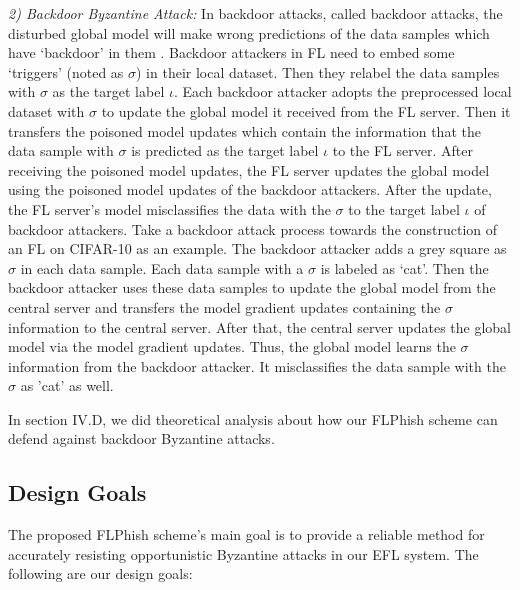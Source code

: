 \documentclass[lettersize,journal]{IEEEtran}
\begin{document}
\par \textit{2) Backdoor Byzantine Attack:} In backdoor attacks, called backdoor attacks, the disturbed global model will make wrong predictions of the data samples which have `backdoor' in them \cite{ref_08_data,ref_09_backdoor,ref_10_backdoor,ref_11_backdoor,ref_19_backdoor}. Backdoor attackers in FL need to embed some `triggers' (noted as $\sigma$) in their local dataset. Then they relabel the data samples with $\sigma$ as the target label $\iota$. Each backdoor attacker adopts the preprocessed local dataset with $\sigma$ to update the global model it received from the FL server. Then it transfers the poisoned model updates which contain the information that the data sample with $\sigma$ is predicted as the target label $\iota$ to the FL server. After receiving the poisoned model updates, the FL server updates the global model using the poisoned model updates of the backdoor attackers. After the update, the FL server's model misclassifies the data with the $\sigma$ to the target label $\iota$ of backdoor attackers. Take a backdoor attack process towards the construction of an FL on CIFAR-10 as an example. The backdoor attacker adds a grey square as $\sigma$ in each data sample. Each data sample with a $\sigma$ is labeled as `cat'. Then the backdoor attacker uses these data samples to update the global model from the central server and transfers the model gradient updates containing the $\sigma$ information to the central server. After that, the central server updates the global model via the model gradient updates. Thus, the global model learns the $\sigma$ information from the backdoor attacker. It misclassifies the data sample with the $\sigma$ as 'cat' as well.
\par In section IV.D, we did theoretical analysis about how our FLPhish scheme can defend against backdoor Byzantine attacks.


\subsection{Design Goals}
The proposed FLPhish scheme's main goal is to provide a reliable method for accurately resisting opportunistic Byzantine attacks in our EFL system. The following are our design goals:
\end{document}
